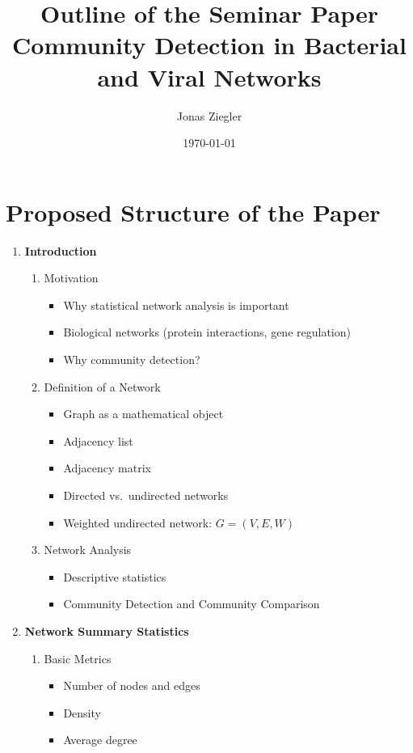 \documentclass[12pt,a4paper]{article}
\title{Outline of the Seminar Paper\\
\large  Community Detection in Bacterial and Viral Networks}
\author{Jonas Ziegler}
\date{\today}
\begin{document}
\maketitle

\section*{Proposed Structure of the Paper}

\begin{enumerate}

\item \textbf{Introduction}
\begin{enumerate}
  \item Motivation
  \begin{itemize}
    \item Why statistical network analysis is important
    \item Biological networks (protein interactions, gene regulation)
    \item Why community detection?
  \end{itemize}

  \item Definition of a Network
  \begin{itemize}
    \item Graph as a mathematical object
    \item Adjacency list
    \item Adjacency matrix
    \item Directed vs.\ undirected networks
    \item Weighted undirected network: $G = (V, E, W)$
  \end{itemize}

  \item Network Analysis
  \begin{itemize}
    \item Descriptive statistics
    \item Community Detection and Community Comparison
  \end{itemize}
\end{enumerate}

\item \textbf{Network Summary Statistics}
\begin{enumerate}
  \item Basic Metrics
  \begin{itemize}
    \item Number of nodes and edges
    \item Density
    \item Average degree
  \end{itemize}


\end{enumerate}
\end{enumerate}
\end{document}
